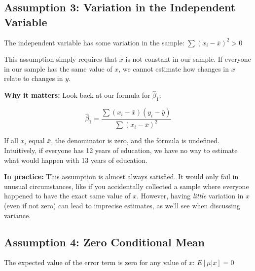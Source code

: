 \documentclass[
  letterpaper,
  DIV=11,
  numbers=noendperiod]{scrreprt}
\begin{document}
\subsection{Assumption 3: Variation in the Independent
Variable}\label{assumption-3-variation-in-the-independent-variable}

\begin{tcolorbox}[enhanced jigsaw, arc=.35mm, bottomrule=.15mm, bottomtitle=1mm, breakable, colback=white, colbacktitle=quarto-callout-note-color!10!white, colframe=quarto-callout-note-color-frame, coltitle=black, left=2mm, leftrule=.75mm, opacityback=0, opacitybacktitle=0.6, rightrule=.15mm, title=\textcolor{quarto-callout-note-color}{\faInfo}\hspace{0.5em}{Gauss-Markov Assumption 3: Sample Variation in \(x\)}, titlerule=0mm, toprule=.15mm, toptitle=1mm]

The independent variable has some variation in the sample:
\(\sum(x_i - \bar{x})^2 > 0\)

\end{tcolorbox}

This assumption simply requires that \(x\) is not constant in our
sample. If everyone in our sample has the same value of \(x\), we cannot
estimate how changes in \(x\) relate to changes in \(y\).

\textbf{Why it matters:} Look back at our formula for \(\hat{\beta}_1\):

\[
\hat{\beta}_1 = \frac{\sum(x_i - \bar{x})(y_i - \bar{y})}{\sum(x_i - \bar{x})^2}
\]

If all \(x_i\) equal \(\bar{x}\), the denominator is zero, and the
formula is undefined. Intuitively, if everyone has 12 years of
education, we have no way to estimate what would happen with 13 years of
education.

\textbf{In practice:} This assumption is almost always satisfied. It
would only fail in unusual circumstances, like if you accidentally
collected a sample where everyone happened to have the exact same value
of \(x\). However, having \emph{little} variation in \(x\) (even if not
zero) can lead to imprecise estimates, as we'll see when discussing
variance.

\subsection{Assumption 4: Zero Conditional
Mean}\label{assumption-4-zero-conditional-mean}

\begin{tcolorbox}[enhanced jigsaw, arc=.35mm, bottomrule=.15mm, bottomtitle=1mm, breakable, colback=white, colbacktitle=quarto-callout-note-color!10!white, colframe=quarto-callout-note-color-frame, coltitle=black, left=2mm, leftrule=.75mm, opacityback=0, opacitybacktitle=0.6, rightrule=.15mm, title=\textcolor{quarto-callout-note-color}{\faInfo}\hspace{0.5em}{Gauss-Markov Assumption 4: Zero Conditional Mean}, titlerule=0mm, toprule=.15mm, toptitle=1mm]

The expected value of the error term is zero for any value of \(x\):
\(E[\mu | x] = 0\)

\end{tcolorbox}
\end{document}
